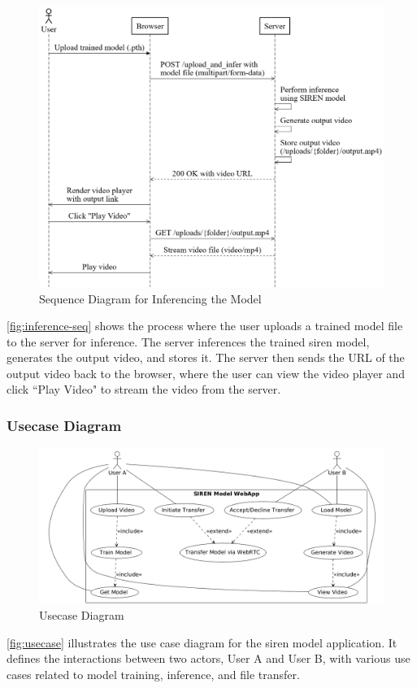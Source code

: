 \begin{figure}[H]
    \centering
    \includegraphics[width=\linewidth]{assets/website/inference_seq.png}
    \caption{Sequence Diagram for Inferencing the Model}
    \label{fig:inference-seq}
\end{figure}
\autoref{fig:inference-seq} shows the process where the user uploads a trained model file to the server for inference. The server inferences the trained \gls{siren} model, generates the output video, and stores it. The server then sends the URL of the output video back to the browser, where the user can view the video player and click ``Play Video" to stream the video from the server.

\subsubsection{Usecase Diagram}
\begin{figure}[H]
    \centering
    \includegraphics[width=\linewidth]{assets/website/usecase.png}
    \caption{Usecase Diagram}
    \label{fig:usecase}
\end{figure}
\autoref{fig:usecase} illustrates the use case diagram for the \gls{siren} model application. It defines the interactions between two actors, User A and User B, with various use cases related to model training, inference, and file transfer.

